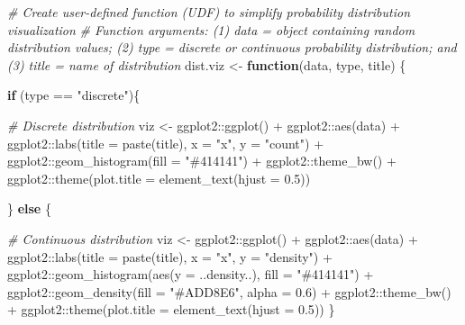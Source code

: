 \documentclass[
]{book}
\newenvironment{Shaded}{\begin{snugshade}}{\end{snugshade}}
\newcommand{\AttributeTok}[1]{\textcolor[rgb]{0.77,0.63,0.00}{#1}}
\newcommand{\CommentTok}[1]{\textcolor[rgb]{0.56,0.35,0.01}{\textit{#1}}}
\newcommand{\ControlFlowTok}[1]{\textcolor[rgb]{0.13,0.29,0.53}{\textbf{#1}}}
\newcommand{\FloatTok}[1]{\textcolor[rgb]{0.00,0.00,0.81}{#1}}
\newcommand{\FunctionTok}[1]{\textcolor[rgb]{0.00,0.00,0.00}{#1}}
\newcommand{\NormalTok}[1]{#1}
\newcommand{\OtherTok}[1]{\textcolor[rgb]{0.56,0.35,0.01}{#1}}
\newcommand{\SpecialCharTok}[1]{\textcolor[rgb]{0.00,0.00,0.00}{#1}}
\newcommand{\StringTok}[1]{\textcolor[rgb]{0.31,0.60,0.02}{#1}}
\begin{document}
\begin{Shaded}
\begin{Highlighting}[]
\CommentTok{\# Create user{-}defined function (UDF) to simplify probability distribution visualization}
\CommentTok{\# Function arguments: (1) data = object containing random distribution values; (2) type = \textquotesingle{}discrete\textquotesingle{} or \textquotesingle{}continuous\textquotesingle{} probability distribution; and (3) title = name of distribution}
\NormalTok{dist.viz }\OtherTok{\textless{}{-}} \ControlFlowTok{function}\NormalTok{(data, type, title) \{}
  
  \ControlFlowTok{if}\NormalTok{ (type }\SpecialCharTok{==} \StringTok{"discrete"}\NormalTok{)\{}
    
    \CommentTok{\# Discrete distribution}
\NormalTok{    viz }\OtherTok{\textless{}{-}}\NormalTok{ ggplot2}\SpecialCharTok{::}\FunctionTok{ggplot}\NormalTok{() }\SpecialCharTok{+} 
\NormalTok{           ggplot2}\SpecialCharTok{::}\FunctionTok{aes}\NormalTok{(data) }\SpecialCharTok{+} 
\NormalTok{           ggplot2}\SpecialCharTok{::}\FunctionTok{labs}\NormalTok{(}\AttributeTok{title =} \FunctionTok{paste}\NormalTok{(title), }\AttributeTok{x =} \StringTok{"x"}\NormalTok{, }\AttributeTok{y =} \StringTok{"count"}\NormalTok{) }\SpecialCharTok{+} 
\NormalTok{           ggplot2}\SpecialCharTok{::}\FunctionTok{geom\_histogram}\NormalTok{(}\AttributeTok{fill =} \StringTok{"\#414141"}\NormalTok{) }\SpecialCharTok{+}
\NormalTok{           ggplot2}\SpecialCharTok{::}\FunctionTok{theme\_bw}\NormalTok{() }\SpecialCharTok{+}
\NormalTok{           ggplot2}\SpecialCharTok{::}\FunctionTok{theme}\NormalTok{(}\AttributeTok{plot.title =} \FunctionTok{element\_text}\NormalTok{(}\AttributeTok{hjust =} \FloatTok{0.5}\NormalTok{))}
    
\NormalTok{  \} }\ControlFlowTok{else}\NormalTok{ \{}
    
    \CommentTok{\# Continuous distribution}
\NormalTok{    viz }\OtherTok{\textless{}{-}}\NormalTok{ ggplot2}\SpecialCharTok{::}\FunctionTok{ggplot}\NormalTok{() }\SpecialCharTok{+} 
\NormalTok{           ggplot2}\SpecialCharTok{::}\FunctionTok{aes}\NormalTok{(data) }\SpecialCharTok{+} 
\NormalTok{           ggplot2}\SpecialCharTok{::}\FunctionTok{labs}\NormalTok{(}\AttributeTok{title =} \FunctionTok{paste}\NormalTok{(title), }\AttributeTok{x =} \StringTok{"x"}\NormalTok{, }\AttributeTok{y =} \StringTok{"density"}\NormalTok{) }\SpecialCharTok{+} 
\NormalTok{           ggplot2}\SpecialCharTok{::}\FunctionTok{geom\_histogram}\NormalTok{(}\FunctionTok{aes}\NormalTok{(}\AttributeTok{y =}\NormalTok{ ..density..), }\AttributeTok{fill =} \StringTok{"\#414141"}\NormalTok{) }\SpecialCharTok{+}
\NormalTok{           ggplot2}\SpecialCharTok{::}\FunctionTok{geom\_density}\NormalTok{(}\AttributeTok{fill =} \StringTok{"\#ADD8E6"}\NormalTok{, }\AttributeTok{alpha =} \FloatTok{0.6}\NormalTok{) }\SpecialCharTok{+}
\NormalTok{           ggplot2}\SpecialCharTok{::}\FunctionTok{theme\_bw}\NormalTok{() }\SpecialCharTok{+}
\NormalTok{           ggplot2}\SpecialCharTok{::}\FunctionTok{theme}\NormalTok{(}\AttributeTok{plot.title =} \FunctionTok{element\_text}\NormalTok{(}\AttributeTok{hjust =} \FloatTok{0.5}\NormalTok{))}
\NormalTok{  \}}


\end{Highlighting}
\end{Shaded}
\end{document}
